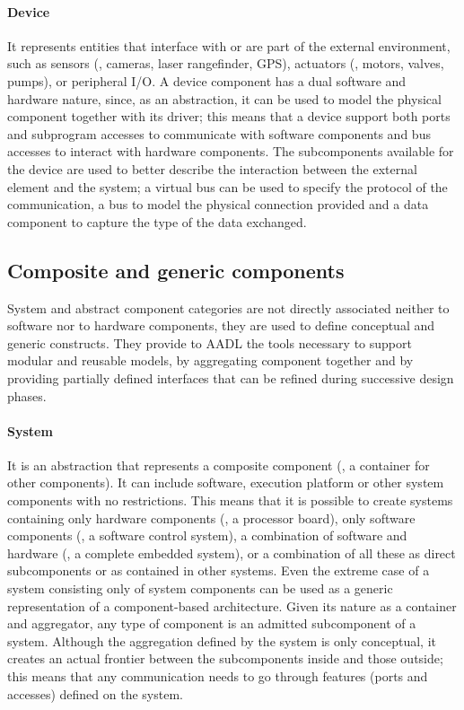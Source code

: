 \paragraph{Device} It represents entities that interface with or are part of the external environment, such as sensors (\eg, cameras, laser rangefinder, GPS), actuators (\eg, motors, valves, pumps), or peripheral I/O. A device component has a dual software and hardware nature, since, as an abstraction, it can be used to model the physical component together with its driver; this means that a device support both ports and subprogram accesses to communicate with software components and bus accesses to interact with hardware components. The subcomponents available for the device are used to better describe the interaction between the external element and the system; a virtual bus can be used to specify the protocol of the communication, a bus to model the physical connection provided and a data component to capture the type of the data exchanged.

\subsection[Composite and generic components]{Composite and generic components}
System and abstract component categories are not directly associated neither to software nor to hardware components, they are used to define conceptual and generic constructs. They provide to AADL the tools necessary to support modular and reusable models, by aggregating component together and by providing partially defined interfaces that can be refined during successive design phases.

\paragraph{System} It is an abstraction that represents a composite component (\ie, a container for other components). It can include software, execution platform or other system components with no restrictions. This means that it is possible to create systems containing only hardware components (\eg, a processor board), only software components (\eg, a software control system), a combination of software and hardware (\eg, a complete embedded system),  or a combination of all these as direct subcomponents or as contained in other systems. Even the extreme case of a system consisting only of system components can be used as a generic representation of a component-based architecture. Given its nature as a container and aggregator, any type of component is an admitted subcomponent of a system. Although the aggregation defined by the system is only conceptual, it creates an actual frontier between the subcomponents inside and those outside; this means that any communication needs to go through features (\ie ports and accesses) defined on the system.

